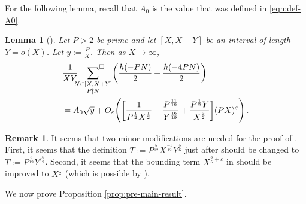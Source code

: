 \documentclass[12pt,letterpaper,reqno]{amsart}
\theoremstyle{plain}
\newtheorem{lemma}[theorem]{Lemma}
\theoremstyle{definition}
\newtheorem{remark}[theorem]{Remark}
\numberwithin{equation}{section}
\numberwithin{figure}{section}
\numberwithin{table}{section}
\newcommand{\lrp}[1]{\!\left(#1\right)}
\begin{document}
For the following lemma, recall that $A_0$ is the value that was defined in \eqref{eqn:def-A0}.
\begin{lemma}[{\cite[Proposition 3.1]{Zubrilina}}] \label{lem:zubrilina-prop-3.1}
    Let $P > 2$ be prime and let $[X, X+Y]$ be an interval of length $Y = o(X)$. Let $y := \frac{P}{X}$. Then as $X \to \infty$, 
    \begin{align}
        &\frac{1}{XY} \sideset{}{^\square}\sum_{\substack{N \in [X, X+Y] \\ P \nmid N}} \lrp{\frac{h(-PN)}{2} + \frac{h(-4PN)}{2}} \\
        &= A_0\sqrt{y} + O_\varepsilon\lrp{\bigg[\frac{1}{P^\frac{1}{2}X^\frac{1}{2}}+\frac{P^\frac{11}{19}}{Y^\frac{16}{19}}+\frac{P^\frac{1}{2}Y}{X^\frac{3}{2}}\bigg](PX)^\varepsilon}.
    \end{align}
\end{lemma}
\begin{remark}
    It seems that two minor modifications are needed for the proof of \cite[Proposition 3.1]{Zubrilina}. First, it seems that the definition $T:=P^\frac{5}{12}X^\frac{-1}{12} Y^\frac{5}{6}$ just after \cite[Equation (7)]{Zubrilina} should be changed to  $T := P^\frac{8}{19} Y^\frac{16}{19}$. 
    Second, it seems that the bounding term $X^{\frac{3}{5}+\varepsilon}$ in \cite[Equation (5)]{Zubrilina} should be improved to $X^{\frac{1}{2}}$ (which is possible by \cite[Theorem 3.5]{Zubrilina}).
\end{remark}

We now prove Proposition \ref{prop:pre-main-result}.
\end{document}
